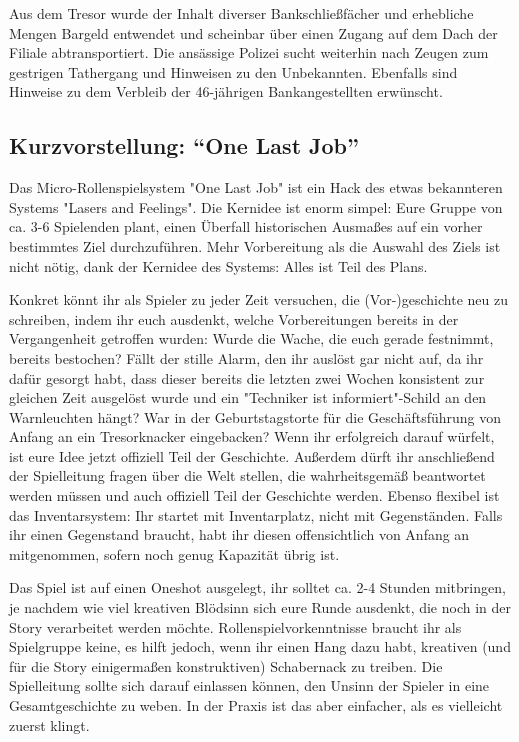 \documentclass[final]{multiversum}
\begin{document}
Aus dem Tresor wurde der Inhalt diverser Bankschließfächer und erhebliche Mengen
Bargeld entwendet und scheinbar über einen Zugang auf dem Dach der Filiale
abtransportiert. Die ansässige Polizei sucht weiterhin nach Zeugen zum gestrigen
Tathergang und Hinweisen zu den Unbekannten. Ebenfalls sind Hinweise zu dem
Verbleib der 46-jährigen Bankangestellten erwünscht. 



\subsection{Kurzvorstellung: \enquote{One Last Job}}
Das Micro-Rollenspielsystem "One Last Job" ist ein Hack des etwas bekannteren
Systems "Lasers and Feelings". Die Kernidee ist enorm simpel: Eure Gruppe von
ca. 3-6 Spielenden plant, einen Überfall historischen Ausmaßes auf ein vorher
bestimmtes Ziel durchzuführen. Mehr Vorbereitung als die Auswahl des Ziels
ist nicht nötig, dank der Kernidee des Systems: Alles ist Teil des Plans.

Konkret könnt ihr als Spieler zu jeder Zeit versuchen, die (Vor-)geschichte neu
zu schreiben, indem ihr euch ausdenkt, welche Vorbereitungen bereits in der
Vergangenheit getroffen wurden: Wurde die Wache, die euch gerade festnimmt,
bereits bestochen? Fällt der stille Alarm, den ihr auslöst gar nicht auf, da ihr
dafür gesorgt habt, dass dieser bereits die letzten zwei Wochen konsistent zur
gleichen Zeit ausgelöst wurde und ein "Techniker ist informiert"-Schild an den
Warnleuchten hängt? War in der Geburtstagstorte für die Geschäftsführung von
Anfang an ein Tresorknacker eingebacken? Wenn ihr erfolgreich darauf würfelt,
ist eure Idee jetzt offiziell Teil der Geschichte. Außerdem dürft ihr
anschließend der Spielleitung fragen über die Welt stellen, die wahrheitsgemäß
beantwortet werden müssen und auch offiziell Teil der Geschichte werden. Ebenso
flexibel ist das Inventarsystem: Ihr startet mit Inventarplatz, nicht mit
Gegenständen. Falls ihr einen Gegenstand braucht, habt ihr diesen offensichtlich
von Anfang an mitgenommen, sofern noch genug Kapazität übrig ist.

Das Spiel ist auf einen Oneshot ausgelegt, ihr solltet ca. 2-4 Stunden
mitbringen, je nachdem wie viel kreativen Blödsinn sich eure Runde ausdenkt, die
noch in der Story verarbeitet werden möchte. Rollenspielvorkenntnisse braucht
ihr als Spielgruppe keine, es hilft jedoch, wenn ihr einen Hang dazu habt,
kreativen (und für die Story einigermaßen konstruktiven) Schabernack zu treiben.
Die Spielleitung sollte sich darauf einlassen können, den Unsinn der Spieler in
eine Gesamtgeschichte zu weben. In der Praxis ist das aber einfacher, als es
vielleicht zuerst klingt.
\end{document}
